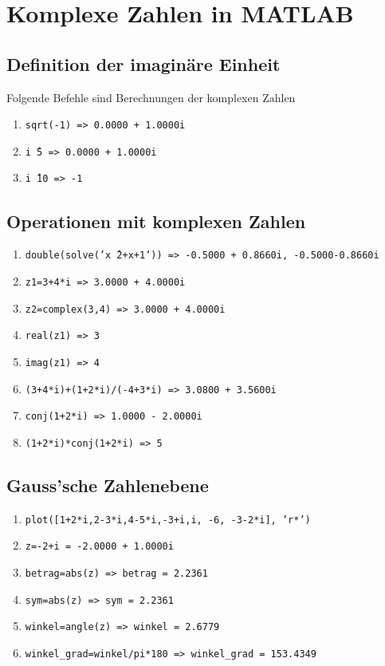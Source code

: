 \section{Komplexe Zahlen in MATLAB}
\subsection{Definition der imaginäre Einheit}
Folgende Befehle sind Berechnungen der komplexen Zahlen
\begin{enumerate}[$\texttt{>}\texttt{>}$]
\item {\color{red}\texttt{sqrt(-1) => 0.0000 + 1.0000i}}
\item {\color{red}\texttt{i\^\,5 => 0.0000 + 1.0000i}}
\item {\color{red}\texttt{i\^\,10 => -1}}
\end{enumerate}
\subsection{Operationen mit komplexen Zahlen}
\begin{enumerate}[$\texttt{>}\texttt{>}$]
\item {\color{red}\texttt{double(solve('x\^\,2+x+1')) => -0.5000 + 0.8660i, -0.5000-0.8660i}}
\item {\color{red}\texttt{z1=3+4*i => 3.0000 + 4.0000i}}
\item {\color{red}\texttt{z2=complex(3,4) => 3.0000 + 4.0000i}} 
\item {\color{red}\texttt{real(z1) => 3}}
\item {\color{red}\texttt{imag(z1) => 4}}
\item {\color{red}\texttt{(3+4*i)+(1+2*i)/(-4+3*i) => 3.0800 + 3.5600i}}
\item {\color{red}\texttt{conj(1+2*i) => 1.0000 - 2.0000i}}
\item {\color{red}\texttt{(1+2*i)*conj(1+2*i) => 5}}
\end{enumerate}
\subsection{Gauss'sche Zahlenebene}
\begin{enumerate}[$\texttt{>}\texttt{>}$]
\item {\color{red}\texttt{plot([1+2*i,2-3*i,4-5*i,-3+i,i, -6, -3-2*i], 'r*')}}
\item {\color{red}\texttt{z=-2+i = -2.0000 + 1.0000i}}
\item {\color{red}\texttt{betrag=abs(z) => betrag =  2.2361}}
\item {\color{red}\texttt{sym=abs(z) => sym =  2.2361}}
\item {\color{red}\texttt{winkel=angle(z) => winkel =  2.6779}}
\item {\color{red}\texttt{winkel\_grad=winkel/pi*180 => winkel\_grad = 153.4349}}
\end{enumerate}
